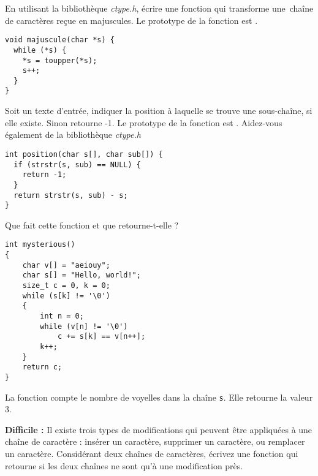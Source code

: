 \documentclass[french,a4paper,addpoints,11pt]{exam}
\begin{document}
\begin{questions}

\question En utilisant la bibliothèque \emph{ctype.h}, écrire une fonction qui transforme une\ chaîne de caractères reçue en majuscules. Le prototype de la fonction est .

\ifprintanswers

\begin{lstlisting}
void majuscule(char *s) {
  while (*s) {
    *s = toupper(*s);
    s++;
  }
}
\end{lstlisting}
\fi

\question Soit un texte d'entrée, indiquer la position à laquelle se trouve une sous-chaîne, si elle existe. Sinon retourne -1. Le prototype de la fonction est . Aidez-vous également de la bibliothèque \emph{ctype.h}

\ifprintanswers

\begin{lstlisting}
int position(char s[], char sub[]) {
  if (strstr(s, sub) == NULL) {
    return -1;
  }
  return strstr(s, sub) - s;
}
\end{lstlisting}
\fi

\question Que fait cette fonction et que retourne-t-elle ?

\begin{lstlisting}
int mysterious()
{
    char v[] = "aeiouy";
    char s[] = "Hello, world!";
    size_t c = 0, k = 0;
    while (s[k] != '\0')
    {
        int n = 0;
        while (v[n] != '\0')
            c += s[k] == v[n++];
        k++;
    }
    return c;
}
\end{lstlisting}

\ifprintanswers
\begin{solution}
La fonction compte le nombre de voyelles dans la chaîne \texttt{s}. Elle retourne la valeur 3.
\end{solution}
\else
\fillwithdottedlines{1cm}
\fi

\question
\textbf{Difficile : } Il existe trois types de modifications qui peuvent être appliquées à une chaîne de caractère : insérer un caractère, supprimer un caractère, ou remplacer un caractère. Considérant deux chaînes de caractères, écrivez une fonction qui retourne si les deux chaînes ne sont qu'à une modification pr\`es.


\end{questions}
\end{document}
